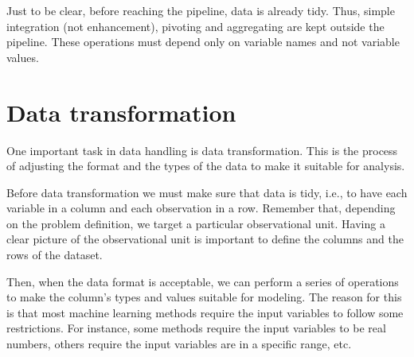 Just to be clear, before reaching the pipeline, data is already tidy.  Thus, simple
integration (not enhancement), pivoting and aggregating are kept outside the pipeline.
These operations must depend only on variable names and not variable values.

\section{Data transformation}

One important task in data handling is data transformation.  This is the process of adjusting
the format and the types of the data to make it suitable for analysis.

Before data transformation we must make sure that data is tidy, i.e., to have
each variable in a column and each observation in a row.  Remember that, depending on the
problem definition, we target a particular observational unit.  Having a clear picture of
the observational unit is important to define the columns and the rows of the dataset.

Then, when the data format is acceptable, we can perform a series of operations to make the
column's types and values suitable for modeling.  The reason for this is that most
machine learning methods require the input variables to follow some restrictions.  For
instance, some methods require the input variables to be real numbers, others require the
input variables are in a specific range, etc.

%
%
%
%

